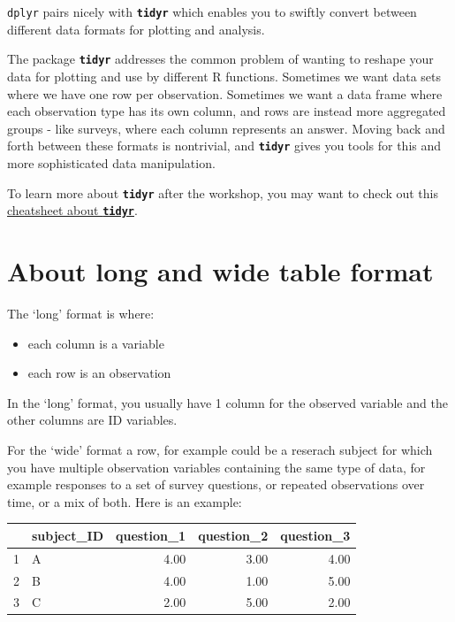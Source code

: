 \documentclass[]{book}
\providecommand{\tightlist}{%
  \setlength{\itemsep}{0pt}\setlength{\parskip}{0pt}}
\begin{document}
\texttt{dplyr} pairs nicely with \textbf{\texttt{tidyr}} which enables you to swiftly convert between different data formats for plotting and analysis.

The package \textbf{\texttt{tidyr}} addresses the common problem of wanting to reshape your data for plotting and use by different R functions. Sometimes we want data sets where we have one row per observation. Sometimes we want a data frame where each observation type has its own column, and rows are instead more aggregated groups - like surveys, where each column represents an answer. Moving back and forth between these formats is nontrivial, and \textbf{\texttt{tidyr}} gives you tools for this and more sophisticated data manipulation.

To learn more about \textbf{\texttt{tidyr}} after the workshop, you may want to check out this \href{https://github.com/rstudio/cheatsheets/raw/master/data-import.pdf}{cheatsheet about \textbf{\texttt{tidyr}}}.

\hypertarget{about-long-and-wide-table-format}{%
\section{About long and wide table format}\label{about-long-and-wide-table-format}}

The `long' format is where:

\begin{itemize}
\tightlist
\item
  each column is a variable
\item
  each row is an observation
\end{itemize}

In the `long' format, you usually have 1 column for the observed variable and
the other columns are ID variables.

For the `wide' format a row, for example could be a reserach subject for which you have multiple observation variables containing the same type of data, for example responses to a set of survey questions, or repeated observations over time, or a mix of both. Here is an example:

\begin{table}[ht]
\centering
\begin{tabular}{rlrrr}
  \hline
 & subject\_ID & question\_1 & question\_2 & question\_3 \\ 
  \hline
1 & A & 4.00 & 3.00 & 4.00 \\ 
  2 & B & 4.00 & 1.00 & 5.00 \\ 
  3 & C & 2.00 & 5.00 & 2.00 \\ 
   \hline
\end{tabular}
\end{table}
\end{document}

